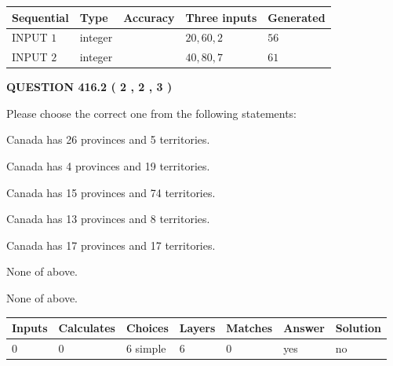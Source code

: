 \documentclass[12pt]{article}
\begin{document}
   
  
  
\noindent\begin{tabular}{|l|l|l|l|l|}
\hline
 Sequential & Type & Accuracy & Three inputs & Generated \\ 
\hline
 
 
  INPUT $  1 $ & integer &  & $
 20
 , 
 60
 , 
 2
 $ & $ 56 $ 
 \\  \hline  
 
 
  INPUT $  2 $ & integer &  & $
 40
 , 
 80
 , 
 7
 $ & $ 61 $ 
 \\  \hline  
 \end{tabular}
   
   
  
\vspace{0.2in}
  
{\textbf{\Large{QUESTION
416.2 
 ( 2 , 2 , 3 )
}}}
  
  
Please choose the correct one from the following statements:
 
 
Canada has  26 provinces and  5 territories.
 
 
Canada has   4 provinces and  19 territories.
 
 
Canada has  15 provinces and  74 territories.
 
 
Canada has  13 provinces and  8 territories.
 
 
Canada has  17 provinces and  17 territories.
 
 
 None of above.
 
 
\noindent{}
 
 
 None of above.
 
 
\noindent{}
 
 
   
   
   
   
\noindent\begin{tabular}{|l|l|l|l|l|l|l|}
 \hline
Inputs & Calculates & Choices & Layers & Matches & Answer & Solution \\ \hline
 0  & 
 0  & 
 6
  simple  
  & 
 6  & 
 0  & 
  yes & 
  no 
  \\ \hline
 \end{tabular}
   
\end{document}

